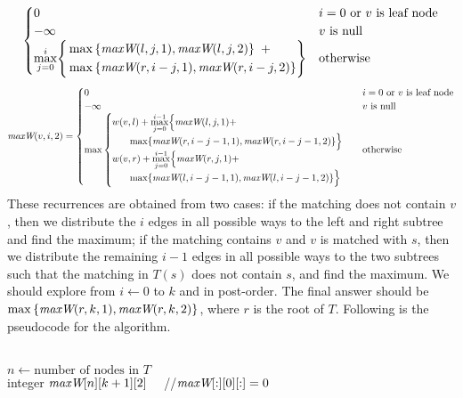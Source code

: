 \documentclass[11pt]{article}
\begin{document}
\begin{solution}
\begin{enumerate}[(a)]
\begin{equation*}
\begin{cases}
	0 &\text{$i=0$ or $v$ is leaf node}
\\	-\infty &\text{$v$ is null}
\\	\overset{i}{\underset{j=0}{\max}}{\Biggl\{
	\begin{split}
	&\max{\{\emph{maxW}(l,j,1),\emph{maxW}(l,j,2)\}}\,\,\,+
\\	&\max{\{\emph{maxW}(r,i-j,1),\emph{maxW}(r,i-j,2)\}}
	\end{split}
	\Biggr\}}
	&\text{otherwise}\\
\end{cases}
\end{equation*}
\begin{equation*}
\emph{maxW}(v, i, 2)=
\begin{cases}
	0 &\text{$i=0$ or $v$ is leaf node}
\\	-\infty &\text{$v$ is null}
\\	\max
	\begin{cases}
	w(v,l)+\overset{i-1}{\underset{j=0}{\max}}\Bigl\{\emph{maxW}(l,j,1)+
\\	\,\,\,\,\,\,\,\,\,\,\,\max\{\emph{maxW}(r,i-j-1,1),\emph{maxW}(r,i-j-1,2)\}\Bigr\}
\\	w(v,r)+\overset{i-1}{\underset{j=0}{\max}}\Bigl\{\emph{maxW}(r,j,1)+
\\	\,\,\,\,\,\,\,\,\,\,\,\max\{\emph{maxW}(l,i-j-1,1),\emph{maxW}(l,i-j-1,2)\}\Bigr\}
	\end{cases}
	&\text{otherwise}\\
\end{cases}
\end{equation*}
These recurrences are obtained from two cases: if the matching does not contain $v$, then we distribute the $i$ edges in all possible ways to the left and right subtree and find the maximum; if the matching contains $v$ and $v$ is matched with $s$, then we distribute the remaining $i-1$ edges in all possible ways to the two subtrees such that the matching in $T(s)$ does not contain $s$, and find the maximum. We should explore from $i\gets 0$ to $k$ and in post-order. The final answer should be $\max{\{\emph{maxW}(r, k, 1), \emph{maxW}(r, k, 2)\}}$, where $r$ is the root of $T$. Following is the pseudocode for the algorithm.
\begin{algo}
	\textsc{}\+
\\	$n\gets \text{number of nodes in $T$}$
\\	integer $\emph{maxW}[n][k+1][2]$\,\,\,\,\,\,\,\,//$\emph{maxW}[:][0][:]=0$

\end{algo}
\end{enumerate}
\end{solution}
\end{document}
